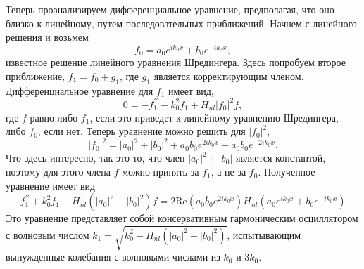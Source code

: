 \documentclass[A4,12pt,oneside]{article}
\renewcommand{\(}{\left(}
\renewcommand{\)}{\right)}
\renewcommand{\Re}{\mathrm{Re}}
\begin{document}
Теперь проанализируем дифференциальное уравнение, предполагая, что оно близко к линейному, путем последовательных приближений. Начнем с линейного решения и возьмем
\begin{equation}
f_0 = a_0 e^{i k_0 x} + b_0 e^{- i k_0 x},
\end{equation}
известное решение линейного уравнения Шредингера.
Здесь попробуем второе приближение, $f_1 = f_0 + g_1$, где $g_1$ является корректирующим членом. Дифференциальное уравнение для $f_1$ имеет вид,
\begin{equation}
0 = - f_1^{\prime\prime} - k_0^2 f_1  + H_{nl} \left|f_0\right|^2 f,
\end{equation}
где $f$ равно либо $f_1$, если это приведет к линейному уравнению Шредингера, либо $f_0$, если нет. Теперь уравнение можно решить для $\left|f_0\right|^2$,
\begin{equation}
\left|f_0\right|^2 = \left|a_0\right|^2 + \left|b_0\right|^2 + a_0\bar{b}_0e^{2ik_0x}+ \bar{a}_0b_0e^{-2ik_0x}.
\end{equation}
Что здесь интересно, так это то, что член $\left|a_0\right|^ 2 + \left|b_0\right| $ является константой, поэтому для этого члена $f$ можно принять за $f_1$, а не за $f_0$. Полученное уравнение имеет вид
\begin{equation}
 f_1^{\prime\prime} + k_0^2 f_1  - H_{nl} \left(\left|a_0\right|^2+\left|b_0\right|^2 \right) f = 2 \Re \left( a_0\bar{b}_0e^{2ik_0x} \right)  H_{nl}\left(a_0 e^{i k_0 x} + b_0 e^{- i k_0 x}\right)
\end{equation}
Это уравнение представляет собой консервативным гармоническим осциллятором с волновым числом $k_1 = \sqrt{k_0^2- H_{nl} \left(\left|a_0\right|^2+\left|b_0\right|^2 \right)}$, испытывающим вынужденные колебания с волновыми числами из $k_0$ и $3k_0$.
\end{document}
